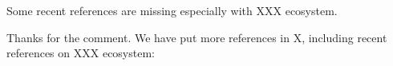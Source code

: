 \documentclass{ar2rc}
\begin{document}
\RC
Some recent references are missing especially with XXX ecosystem.

%
\AR
Thanks for the comment.
We have put more references in X, 
including recent references on XXX ecosystem:



%
%

\end{document}
